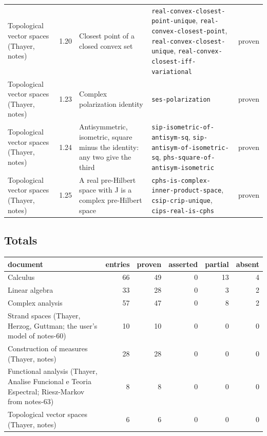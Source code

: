 \begin{longtable}{@{}ll>{\raggedright\arraybackslash}p{4.2cm}>{\raggedright\arraybackslash}p{4.2cm}l@{}}
Topological vector spaces (Thayer, notes) & 1.20 & Closest point of a closed convex set & \texttt{real-\allowbreak{}convex-\allowbreak{}closest-\allowbreak{}point-\allowbreak{}unique}, \texttt{real-\allowbreak{}convex-\allowbreak{}closest-\allowbreak{}point}, \texttt{real-\allowbreak{}convex-\allowbreak{}closest-\allowbreak{}unique}, \texttt{real-\allowbreak{}convex-\allowbreak{}closest-\allowbreak{}iff-\allowbreak{}variational} & proven \\
Topological vector spaces (Thayer, notes) & 1.23 & Complex polarization identity & \texttt{ses-\allowbreak{}polarization} & proven \\
Topological vector spaces (Thayer, notes) & 1.24 & Antisymmetric, isometric, square minus the identity: any two give the third & \texttt{sip-\allowbreak{}isometric-\allowbreak{}of-\allowbreak{}antisym-\allowbreak{}sq}, \texttt{sip-\allowbreak{}antisym-\allowbreak{}of-\allowbreak{}isometric-\allowbreak{}sq}, \texttt{phs-\allowbreak{}square-\allowbreak{}of-\allowbreak{}antisym-\allowbreak{}isometric} & proven \\
Topological vector spaces (Thayer, notes) & 1.25 & A real pre-Hilbert space with J is a complex pre-Hilbert space & \texttt{cphs-\allowbreak{}is-\allowbreak{}complex-\allowbreak{}inner-\allowbreak{}product-\allowbreak{}space}, \texttt{csip-\allowbreak{}crip-\allowbreak{}unique}, \texttt{cips-\allowbreak{}real-\allowbreak{}is-\allowbreak{}cphs} & proven \\
\hline
\end{longtable}
%
\subsection*{Totals}
%
\begin{tabular}{@{}lrrrrr@{}}
\hline
document & entries & proven & asserted & partial & absent \\
\hline
Calculus & 66 & 49 & 0 & 13 & 4 \\
Linear algebra & 33 & 28 & 0 & 3 & 2 \\
Complex analysis & 57 & 47 & 0 & 8 & 2 \\
Strand spaces (Thayer, Herzog, Guttman; the user's model of notes-60) & 10 & 10 & 0 & 0 & 0 \\
Construction of measures (Thayer, notes) & 28 & 28 & 0 & 0 & 0 \\
Functional analysis (Thayer, Analise Funcional e Teoria Espectral; Riesz-Markov from notes-63) & 8 & 8 & 0 & 0 & 0 \\
Topological vector spaces (Thayer, notes) & 6 & 6 & 0 & 0 & 0 \\
\hline
\end{tabular}
%
